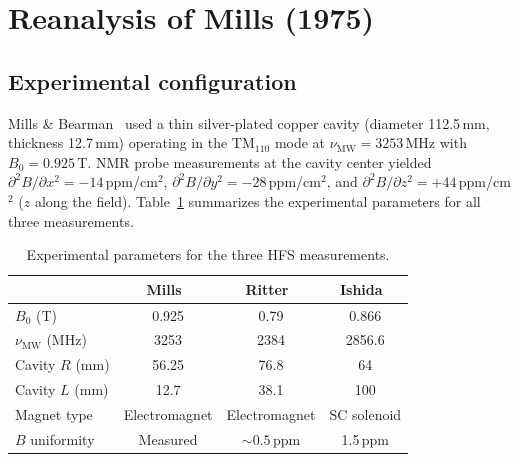 \documentclass[twocolumn,pra,aps,superscriptaddress,floatfix,10pt]{revtex4-2}
\begin{document}
\section{Reanalysis of Mills (1975)}
\label{sec:mills}

\subsection{Experimental configuration}

Mills \& Bearman~\cite{Mills1975} used a thin silver-plated copper cavity (diameter 112.5\,mm, thickness 12.7\,mm) operating in the TM$_{110}$ mode at $\nu_\mathrm{MW} = 3253$\,MHz with $B_0 = 0.925$\,T. NMR probe measurements at the cavity center yielded $\partial^2 B/\partial x^2 = -14$\,ppm/cm$^2$, $\partial^2 B/\partial y^2 = -28$\,ppm/cm$^2$, and $\partial^2 B/\partial z^2 = +44$\,ppm/cm$^2$ ($z$ along the field). Table~\ref{tab:experiments} summarizes the experimental parameters for all three measurements.

\begin{table}[b]
\caption{Experimental parameters for the three HFS measurements.}
\label{tab:experiments}
\begin{ruledtabular}
\begin{tabular}{lccc}
 & Mills~\cite{Mills1975} & Ritter~\cite{Ritter1984} & Ishida~\cite{Ishida2014} \\
\hline
$B_0$ (T) & 0.925 & 0.79 & 0.866 \\
$\nu_\mathrm{MW}$ (MHz) & 3253 & 2384 & 2856.6 \\
Cavity $R$ (mm) & 56.25 & 76.8 & 64 \\
Cavity $L$ (mm) & 12.7 & 38.1 & 100 \\
Magnet type & Electromagnet & Electromagnet & SC solenoid \\
$B$ uniformity & Measured\footnotemark[1] & $\sim 0.5$\,ppm\footnotemark[2] & 1.5\,ppm\footnotemark[3] \\
\end{tabular}
\end{ruledtabular}
\end{table}
\end{document}
